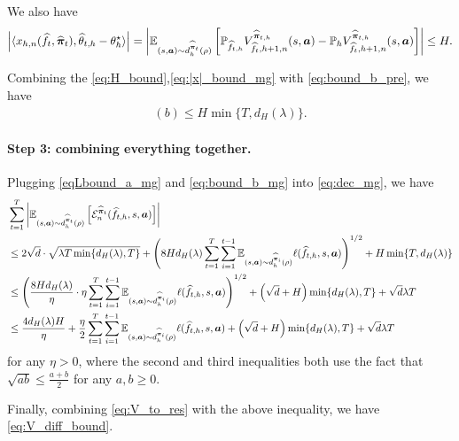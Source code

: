 We also have
\begin{align}\label{eq:H_bound}
    \left| \langle x_{h,n}(\widehat{f}_{t},\widehat{{\bm{\pi}}}_{t}),\widehat{\theta}_{t,h}-\theta_h^\star\rangle\right|=\left|\mathbb{E}_{(s,{\bm{a}})\sim d_h^{\widehat{{\bm{\pi}}}_{t}}(\rho)}\left[{\mathbb P}_{\widehat{f}_{t,h}} V_{\widehat{f}_{t},h+1,n}^{\widehat{{\bm{\pi}}}_{t,h}}(s,{\bm{a}})-{\mathbb P}_h V_{\widehat{f}_{t},h+1,n}^{\widehat{{\bm{\pi}}}_{t,h}}(s,{\bm{a}})\right]\right|\leq H.
\end{align}

Combining the \eqref{eq:H_bound},\eqref{eq:|x|_bound_mg} with \eqref{eq:bound_b_pre}, we have
\begin{align}\label{eq:bound_b_mg}
    (b)\leq H\min\{T, d_H(\lambda)\}.
\end{align}

\paragraph{Step 3: combining everything together.}
Plugging \eqref{eqLbound_a_mg} and \eqref{eq:bound_b_mg} into \eqref{eq:dec_mg}, we have
\begin{align*}
    &\sum_{t=1}^T \left| \mathbb{E}_{(s,{\bm{a}})\sim d_h^{\widehat{{\bm{\pi}}}_{t}}(\rho)}\left[{\mathcal{E}}_n^{\widehat{{\bm{\pi}}}_{t}}(\widehat{f}_{t,h},s,{\bm{a}})\right]\right|\notag\\
    &\leq 2\sqrt{d}\cdot\sqrt{\lambda T \min\{d_H(\lambda),T\}} + \left(8Hd_H(\lambda)\sum_{t=1}^T \sum_{i=1}^{t-1} \mathbb{E}_{(s,{\bm{a}})\sim d_h^{\widehat{{\bm{\pi}}}_i}(\rho)}\ell(\widehat{f}_{t,h},s,{\bm{a}})\right)^{1/2}+H \min\{T, d_H(\lambda)\}\notag\\
    &\leq \left(\frac{8Hd_H(\lambda)}{\eta}\cdot\eta\sum_{t=1}^T \sum_{i=1}^{t-1}  \mathbb{E}_{(s,{\bm{a}})\sim d_h^{\widehat{{\bm{\pi}}}_i}(\rho)}\ell(\widehat{f}_{t,h},s,{\bm{a}})\right)^{1/2} + \left(\sqrt{d}+H\right) \min\{d_H(\lambda),T\} +\sqrt{d} \lambda T\notag\\
    &\leq \frac{4d_H(\lambda)H}{\eta} +\frac{\eta}{2}\sum_{t=1}^T \sum_{i=1}^{t-1} \mathbb{E}_{(s,{\bm{a}})\sim d_h^{\widehat{{\bm{\pi}}}_i}(\rho)}\ell(\widehat{f}_{t,h},s,{\bm{a}}) + \left(\sqrt{d}+H\right) \min\{d_H(\lambda),T\} +\sqrt{d} \lambda T
\end{align*}
for any $\eta>0$, where the second and third inequalities both use the fact that $\sqrt{ab}\leq \frac{a+b}{2}$ for any $a,b\geq 0$. 

Finally, combining \eqref{eq:V_to_res} with the above inequality, we have \eqref{eq:V_diff_bound}.
